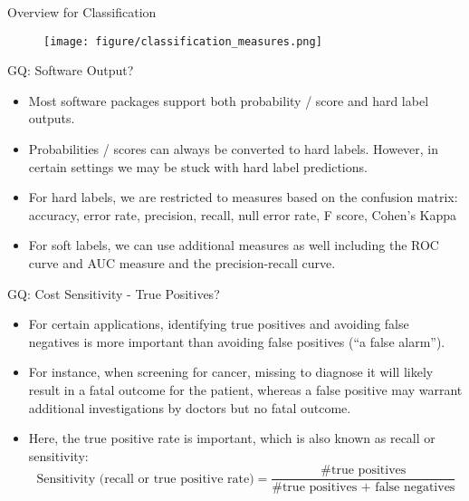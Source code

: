 \documentclass[11pt,compress,t,notes=noshow, aspectratio=169, xcolor=table]{beamer}
\begin{document}
\begin{frame}{Overview for Classification}
    \begin{figure}
        \centering
        \texttt{[image: figure/classification\_measures.png]}
    \end{figure}
    
\end{frame}

\begin{frame}{GQ: Software Output?}
    \begin{itemize}
        \item Most software packages support both probability / score and hard label outputs.
        \item Probabilities / scores can always be converted to hard labels. However, in certain settings we may be stuck with hard label predictions.
        \item For hard labels, we are restricted to measures based on the confusion matrix: accuracy, error rate, precision, recall, null error rate, F score, Cohen's Kappa
        \item For soft labels, we can use additional measures as well including the ROC curve and AUC measure and the precision-recall curve.
    \end{itemize}
\end{frame}


\begin{frame}{GQ: Cost Sensitivity - True Positives?}
    \begin{itemize}
        \item For certain applications, identifying true positives and avoiding false negatives is more important than avoiding false positives (\enquote{a false alarm}). 
        \item For instance, when screening for cancer, missing to diagnose it will likely result in a fatal outcome for the patient, whereas a false positive may warrant additional investigations by doctors but no fatal outcome.
        \item Here, the true positive rate is important, which is also known as recall or sensitivity:
            $$
                \text{Sensitivity (recall or true positive rate)} = \frac{\text{\# true positives}}{\text{\# true positives + false negatives}}
            $$
    \end{itemize}
\end{frame}
\end{document}
